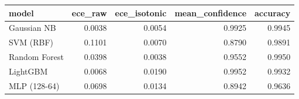 \begin{tabular}{lrrrr}
\toprule
model & ece_raw & ece_isotonic & mean_confidence & accuracy \\
\midrule
Gaussian NB & 0.0038 & 0.0054 & 0.9925 & 0.9945 \\
SVM (RBF) & 0.1101 & 0.0070 & 0.8790 & 0.9891 \\
Random Forest & 0.0398 & 0.0038 & 0.9552 & 0.9950 \\
LightGBM & 0.0068 & 0.0190 & 0.9952 & 0.9932 \\
MLP (128-64) & 0.0698 & 0.0134 & 0.8942 & 0.9636 \\
\bottomrule
\end{tabular}
